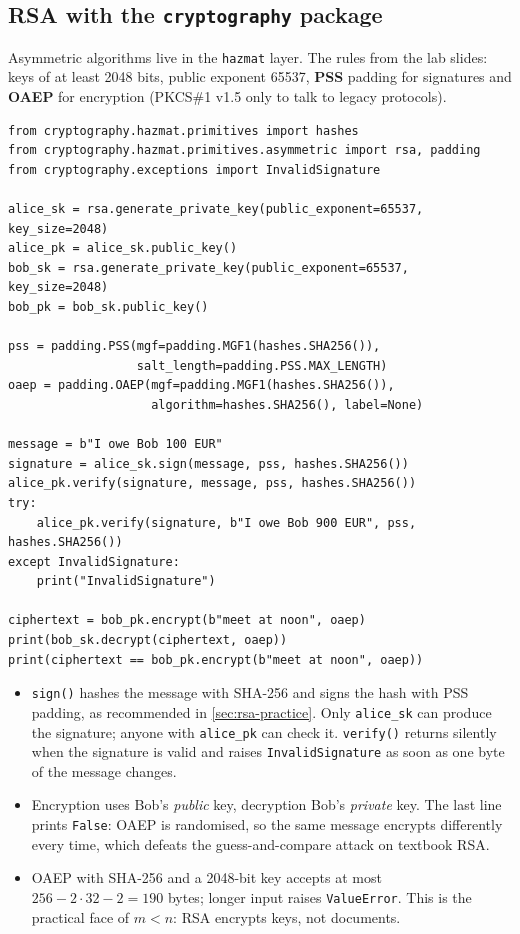 \subsection{RSA with the \texttt{cryptography} package}

Asymmetric algorithms live in the \texttt{hazmat} layer. The rules from the lab slides: keys of at least 2048 bits, public exponent 65537, \textbf{PSS} padding for signatures and \textbf{OAEP} for encryption (PKCS\#1 v1.5 only to talk to legacy protocols).

\begin{verbatim}
from cryptography.hazmat.primitives import hashes
from cryptography.hazmat.primitives.asymmetric import rsa, padding
from cryptography.exceptions import InvalidSignature

alice_sk = rsa.generate_private_key(public_exponent=65537, key_size=2048)
alice_pk = alice_sk.public_key()
bob_sk = rsa.generate_private_key(public_exponent=65537, key_size=2048)
bob_pk = bob_sk.public_key()

pss = padding.PSS(mgf=padding.MGF1(hashes.SHA256()),
                  salt_length=padding.PSS.MAX_LENGTH)
oaep = padding.OAEP(mgf=padding.MGF1(hashes.SHA256()),
                    algorithm=hashes.SHA256(), label=None)

message = b"I owe Bob 100 EUR"
signature = alice_sk.sign(message, pss, hashes.SHA256())
alice_pk.verify(signature, message, pss, hashes.SHA256())
try:
    alice_pk.verify(signature, b"I owe Bob 900 EUR", pss, hashes.SHA256())
except InvalidSignature:
    print("InvalidSignature")

ciphertext = bob_pk.encrypt(b"meet at noon", oaep)
print(bob_sk.decrypt(ciphertext, oaep))
print(ciphertext == bob_pk.encrypt(b"meet at noon", oaep))
\end{verbatim}

\begin{itemize}
    \item \texttt{sign()} hashes the message with SHA-256 and signs the hash with PSS padding, as recommended in \cref{sec:rsa-practice}. Only \texttt{alice\_sk} can produce the signature; anyone with \texttt{alice\_pk} can check it. \texttt{verify()} returns silently when the signature is valid and raises \texttt{InvalidSignature} as soon as one byte of the message changes.
    \item Encryption uses Bob's \emph{public} key, decryption Bob's \emph{private} key. The last line prints \texttt{False}: OAEP is randomised, so the same message encrypts differently every time, which defeats the guess-and-compare attack on textbook RSA.
    \item OAEP with SHA-256 and a 2048-bit key accepts at most $256 - 2 \cdot 32 - 2 = 190$ bytes; longer input raises \texttt{ValueError}. This is the practical face of $m < n$: RSA encrypts keys, not documents.
\end{itemize}

